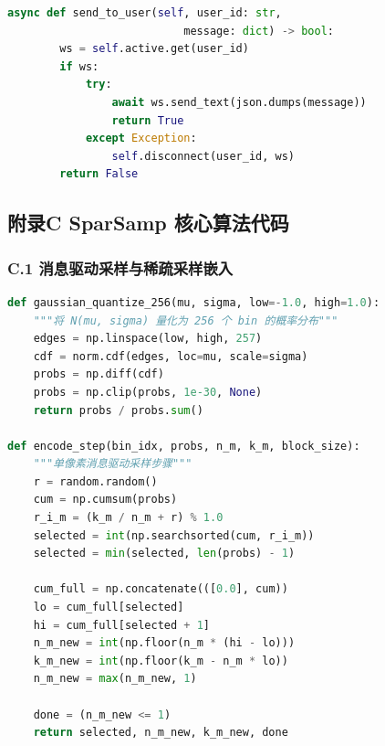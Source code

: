 \begin{appendix}
\begin{lstlisting}[language=Python]
    async def send_to_user(self, user_id: str,
                           message: dict) -> bool:
        ws = self.active.get(user_id)
        if ws:
            try:
                await ws.send_text(json.dumps(message))
                return True
            except Exception:
                self.disconnect(user_id, ws)
        return False
\end{lstlisting}

\subsection*{附录C \quad SparSamp 核心算法代码}

\subsubsection*{C.1 \quad 消息驱动采样与稀疏采样嵌入}

\begin{lstlisting}[language=Python]
def gaussian_quantize_256(mu, sigma, low=-1.0, high=1.0):
    """将 N(mu, sigma) 量化为 256 个 bin 的概率分布"""
    edges = np.linspace(low, high, 257)
    cdf = norm.cdf(edges, loc=mu, scale=sigma)
    probs = np.diff(cdf)
    probs = np.clip(probs, 1e-30, None)
    return probs / probs.sum()

def encode_step(bin_idx, probs, n_m, k_m, block_size):
    """单像素消息驱动采样步骤"""
    r = random.random()
    cum = np.cumsum(probs)
    r_i_m = (k_m / n_m + r) % 1.0
    selected = int(np.searchsorted(cum, r_i_m))
    selected = min(selected, len(probs) - 1)

    cum_full = np.concatenate(([0.0], cum))
    lo = cum_full[selected]
    hi = cum_full[selected + 1]
    n_m_new = int(np.floor(n_m * (hi - lo)))
    k_m_new = int(np.floor(k_m - n_m * lo))
    n_m_new = max(n_m_new, 1)

    done = (n_m_new <= 1)
    return selected, n_m_new, k_m_new, done
\end{lstlisting}

\end{appendix}
